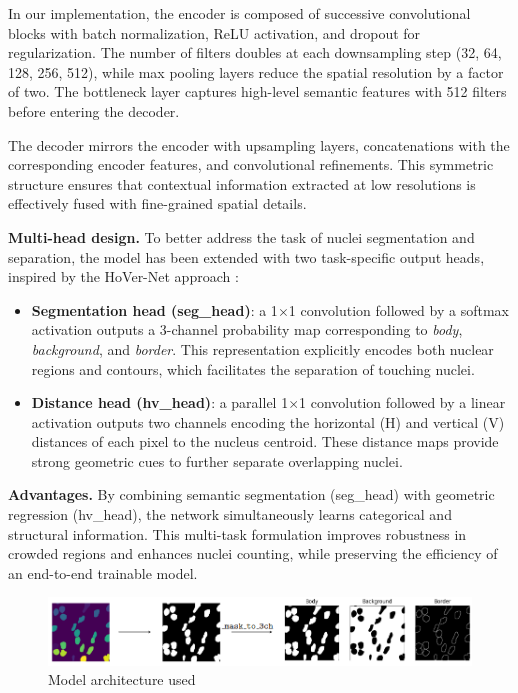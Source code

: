 \documentclass[target=bach,aauheader=,style=]{thud}
\begin{document}
In our implementation, the encoder is composed of successive convolutional blocks with batch normalization, ReLU activation, and dropout for regularization. 
The number of filters doubles at each downsampling step (32, 64, 128, 256, 512), while max pooling layers reduce the spatial resolution by a factor of two. 
The bottleneck layer captures high-level semantic features with 512 filters before entering the decoder.

The decoder mirrors the encoder with upsampling layers, concatenations with the corresponding encoder features, and convolutional refinements. 
This symmetric structure ensures that contextual information extracted at low resolutions is effectively fused with fine-grained spatial details.

\noindent\textbf{Multi-head design.}  
To better address the task of nuclei segmentation and separation, the model has been extended with two task-specific output heads, inspired by the HoVer-Net approach \cite{graham2019hovernet}:  
\begin{itemize}
    \item \textbf{Segmentation head (seg\_head)}: a 1$\times$1 convolution followed by a softmax activation outputs a 3-channel probability map corresponding to \textit{body}, \textit{background}, and \textit{border}. This representation explicitly encodes both nuclear regions and contours, which facilitates the separation of touching nuclei.  
    \item \textbf{Distance head (hv\_head)}: a parallel 1$\times$1 convolution followed by a linear activation outputs two channels encoding the horizontal (H) and vertical (V) distances of each pixel to the nucleus centroid. These distance maps provide strong geometric cues to further separate overlapping nuclei.  
\end{itemize}

\noindent\textbf{Advantages.}  
By combining semantic segmentation (seg\_head) with geometric regression (hv\_head), the network simultaneously learns categorical and structural information. 
This multi-task formulation improves robustness in crowded regions and enhances nuclei counting, while preserving the efficiency of an end-to-end trainable model.
\begin{figure}[H] %
    \centering
    \includegraphics[width=1\textwidth]{imgs/binarymask_transform.png}
    \caption{Model architecture used}
    \label{fig:Unet}
\end{figure}
\end{document}
